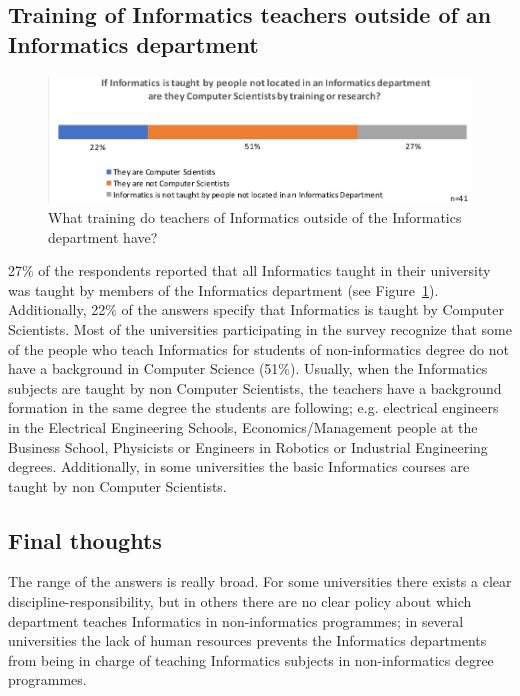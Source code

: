 \subsection{Training of Informatics teachers outside of an Informatics department}

\begin{figure}[h]
\includegraphics[width = \linewidth]{charts/2d.jpg}
\caption{What training do teachers of Informatics outside of the Informatics department have?}
\label{sect3:whoteaches}
\end{figure}
27\% of the respondents reported that all Informatics taught in their university was taught by members of the Informatics department (see Figure~\ref{sect3:whoteaches}).
Additionally, 22\% of the answers specify that Informatics is taught by Computer Scientists. 
Most of the universities participating in the survey recognize that some of the people who teach Informatics for students of non-informatics degree do not have a background in Computer Science (51\%). Usually, when the Informatics subjects are  taught by non Computer Scientists, the teachers have a background formation in the same degree the students are following; e.g. electrical engineers in the Electrical Engineering Schools, Economics/Management people at the Business School, Physicists or Engineers in Robotics or Industrial Engineering degrees. Additionally, in some universities the basic Informatics courses  are taught by non Computer Scientists.   


\subsection{Final thoughts}

The range of the answers is really broad. For some universities there exists a clear discipline-responsibility, but in others there are no clear policy about which department teaches Informatics in non-informatics programmes; in several universities the lack of human resources prevents the Informatics departments from being in charge of teaching Informatics subjects in non-informatics degree programmes.
